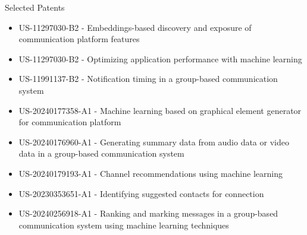 \documentclass{resume} %
\begin{document}
\begin{rSection}{Selected Patents}
\begin{itemize}
	\item US-11297030-B2 -  Embeddings-based discovery and exposure of communication platform features
	\item US-11297030-B2 - Optimizing application performance with machine learning
	\item US-11991137-B2 - Notification timing in a group-based communication system
	\item US-20240177358-A1 - Machine learning based on graphical element generator for communication platform
	\item US-20240176960-A1 - Generating summary data from audio data or video data in a group-based communication system
	\item US-20240179193-A1 - Channel recommendations using machine learning
	\item US-20230353651-A1 - Identifying suggested contacts for connection
	\item US-20240256918-A1 - Ranking and marking messages in a group-based communication system using machine learning techniques
\end{itemize}
\end{rSection}


\end{document}
